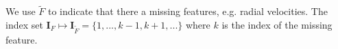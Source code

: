 \documentclass[twocolumn]{aastex631}
\newcommand{\mbs}[1]{\boldsymbol{#1}}
\newcommand{\mbf}[1]{\mathbf{#1}}
\begin{document}
    We use $\tilde{F}$ to indicate that there a missing features, e.g. radial velocities.
    The index set $\mbs{I}_F \mapsto \mbs{I}_{\tilde{F}} = \{1, ..., k-1, k+1, ... \}$ where $k$ is the index of the missing feature.







\end{document}
